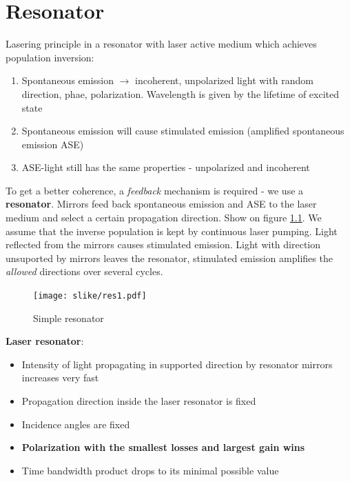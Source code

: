 \chapter{Resonator}
Lasering principle in a resonator with laser active medium which achieves population inversion:
\begin{enumerate}
    \item Spontaneous emission $\rightarrow$ incoherent, unpolarized light with random direction, phae, polarization. Wavelength is given by the lifetime of excited state
    \item Spontaneous emission will cause stimulated emission (amplified spontaneous emission ASE)
    \item ASE-light still has the same properties - unpolarized and incoherent 
\end{enumerate}
To get a better coherence, a \textit{feedback} mechanism is required - we use a \textbf{resonator}.
Mirrors feed back spontaneous emission and ASE to the laser medium and select a certain propagation direction.
Show on figure \ref{fig:res1}. We assume that the inverse population is kept by continuous laser pumping. Light reflected from the mirrors causes stimulated emission. Light with direction unsuported by mirrors leaves the resonator,
stimulated emission amplifies the \textit{allowed} directions over several cycles. 

\begin{figure}[h!]
    \centering
    \texttt{[image: slike/res1.pdf]}
    \caption{Simple resonator}
    \label{fig:res1}
\end{figure}

\textbf{Laser resonator}:
\begin{itemize}
    \item Intensity of light propagating in supported direction by resonator mirrors increases very fast 
    \item Propagation direction inside the laser resonator is fixed
    \item Incidence angles are fixed
    \item \textbf{Polarization with the smallest losses and largest gain wins}
    \item Time bandwidth product drops to its minimal possible value
\end{itemize}

